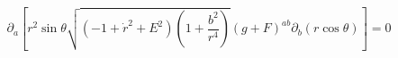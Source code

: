 \begin{equation}
\partial_a \left[ r^2 \sin\theta \sqrt{(-1+\dot{r}^2+E^2)
\left(1+\frac{b^2}{r^4}\right)} (g+F)^{ab} \partial_b (r
\cos\theta) \right] =0
\end{equation}

